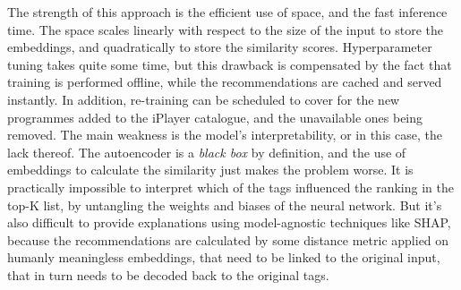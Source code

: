 The strength of this approach is the efficient use of space, and the fast inference time.
The space scales linearly with respect to the size of the input to store the embeddings,
and quadratically to store the similarity scores.
Hyperparameter tuning takes quite some time, but this drawback is compensated by the fact that training is performed offline,
while the recommendations are cached and served instantly. In addition, re-training can be scheduled to cover for the new
programmes added to the iPlayer catalogue, and the unavailable ones being removed.
The main weakness is the model's interpretability, or in this case, the lack thereof.
The autoencoder is a \textit{black box} by definition, and the
use of embeddings to calculate the similarity just makes the problem worse.
It is practically impossible to interpret which of the tags influenced
the ranking in the top-K list, by untangling the weights and biases of the neural network.
But it's also difficult to provide explanations using model-agnostic techniques like SHAP,
because the recommendations are calculated by some distance metric applied on
humanly meaningless embeddings, that need to be linked to the original input, that in turn needs to be
decoded back to the original tags.
